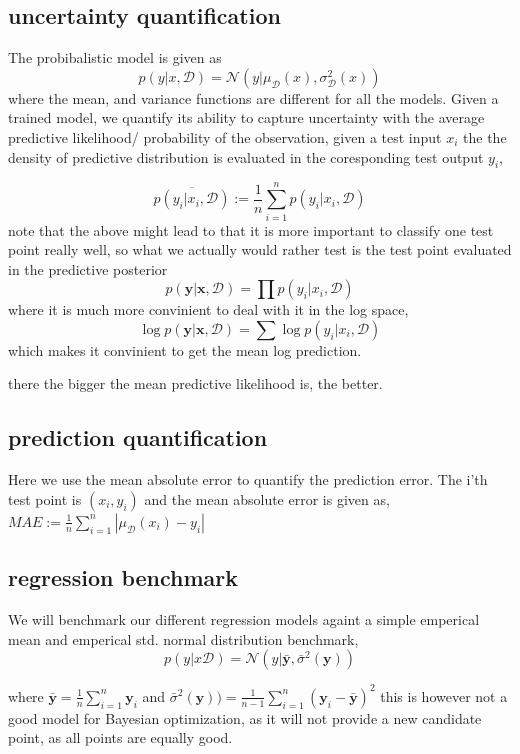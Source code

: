 \subsection{uncertainty quantification}
The probibalistic model is given as 
$$p(y|x,\mathcal{D}) = \mathcal{N}(y|\mu_{\mathcal{D}}(x), \sigma_{\mathcal{D}}^2(x))$$
where the mean, and variance functions are different for all the models. 
Given a trained model, we quantify its ability to capture uncertainty with the average
predictive likelihood/ probability of the observation, given a test input $x_i$ the
the density of predictive distribution is evaluated in the coresponding test output $y_i$,

$$\overline{p(y_i|x_i,\mathcal{D})} := \frac{1}{n}\sum_{i=1}^n p(y_i|x_i,\mathcal{D})$$
note that the above might lead to that it is more important to classify one test point
really well, so what we actually would rather test is the test point evaluated in the predictive
posterior $$p(\textbf{y}|\textbf{x}, \mathcal{D}) = \prod p(y_i|x_i, \mathcal{D})$$
where it is much more convinient to deal with it in the log space, 
 $$\log p(\textbf{y}|\textbf{x}, \mathcal{D}) = \sum \log p(y_i|x_i, \mathcal{D})$$
which makes it convinient to get the mean log prediction. 

there the bigger the mean predictive likelihood is, the better. 

\subsection{prediction quantification}
Here we use the mean absolute error to quantify the prediction error. The i'th test point is
$(x_i,y_i)$ and the mean absolute error is given as, 
$MAE :=\frac{1}{n}\sum_{i=1}^n |\mu_{\mathcal{D}}(x_i) - y_i| $

\subsection{regression benchmark}
We will benchmark our different regression models againt a simple emperical mean and
emperical std. normal distribution benchmark, 
$$p(y|x\mathcal{D}) = \mathcal{N}(y| \bar{\textbf{y}} , \bar{\sigma}^2 (\textbf{y}))$$

where $\bar{\textbf{y}} = \frac{1}{n}\sum_{i=1}^n \textbf{y}_i $ and 
$\bar{\sigma}^2 (\textbf{y})) = \frac{1}{n-1}\sum_{i=1}^n (\textbf{y}_i-\bar{\textbf{y}})^2 $
this is however not a good model for Bayesian optimization, as it will not provide a
new candidate point, as all points are equally good. 


